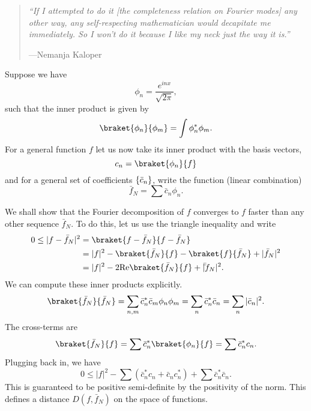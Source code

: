 \begin{quote}
    \textit{``If I attempted to do it [the completeness relation on Fourier modes] any other way, any self-respecting mathematician would decapitate me immediately. So I won't do it because I like my neck just the way it is.''}
    
    ---Nemanja Kaloper
\end{quote}
Suppose we have
\begin{equation}
    \phi_n = \frac{e^{inx}}{\sqrt{2\pi}},
\end{equation}
such that the inner product is given by
\begin{equation}
    \braket{\phi_n}{\phi_m} = \int \phi_n^* \phi_m.
\end{equation}
For a general function $f$ let us now take its inner product with the basis vectors,
\begin{equation}
    c_n = \braket{\phi_n}{f}
\end{equation}
and for a general set of coefficients $\{\bar c_n\}$, write the function (linear combination)
\begin{equation}
    \bar f_N = \sum \bar c_n \phi_n.
\end{equation}

We shall show that the Fourier decomposition of $f$ converges to $f$ faster than any other sequence $\bar f_N$. To do this, let us use the triangle inequality and write
\begin{align}
    0 \leq |f - \bar f_N|^2 &= \braket{f-\bar f_N}{f-\bar f_N}\\
        &= |f|^2 -\braket{\bar f_N}{f} -\braket{f}{\bar f_N} +|\bar f_N|^2\\
        &=|f|^2 -2\text{Re}\braket{\bar f_N}{f} +|\bar \bar f_N|^2.
\end{align}
We can compute these inner products explicitly.
\begin{equation}
    \braket{\bar f_N}{\bar f_N} = \sum_{n,m} \bar c_n^* \bar c_m \phi_n \phi_m = \sum_n \bar c_n^* \bar c_n = \sum_n |\bar c_n|^2.
\end{equation}
The cross-terms are
\begin{equation}
    \braket{\bar f_N}{f} = \sum \bar c_n^* \braket{\phi_n}{f}  = \sum \bar c_n^* c_n.
\end{equation}
Plugging back in, we have
\begin{equation}
    0 \leq |f|^2 - \sum(\bar c_n^* c_n + \bar c_n c_n^*) + \sum \bar c_n^* \bar c_n.
\end{equation}
This is guaranteed to be positive semi-definite by the positivity of the norm. This defines a distance $D(f,\bar f_N)$ on the space of functions.

